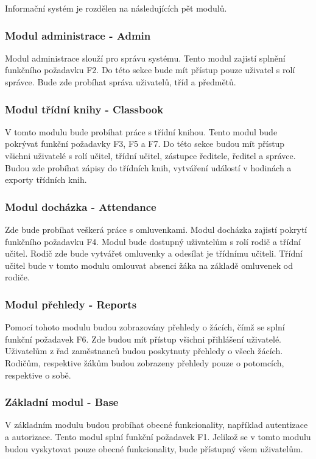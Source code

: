 Informační systém je rozdělen na následujících pět modulů.

\subsubsection*{Modul administrace - Admin}
Modul administrace slouží pro správu systému. Tento modul zajistí splnění funkčního požadavku F2. Do této sekce bude mít přístup pouze uživatel s rolí správce. Bude zde probíhat správa uživatelů, tříd a předmětů.

\subsubsection*{Modul třídní knihy - Classbook}
V tomto modulu bude probíhat práce s třídní knihou. Tento modul bude pokrývat funkční požadavky F3, F5 a F7. Do této sekce budou mít přístup všichni uživatelé s rolí učitel, třídní učitel, zástupce ředitele, ředitel a správce. Budou zde probíhat zápisy do třídních knih, vytváření událostí v hodinách a exporty třídních knih.

\subsubsection*{Modul docházka - Attendance}
Zde bude probíhat veškerá práce s omluvenkami. Modul docházka zajistí pokrytí funkčního požadavku F4. Modul bude dostupný uživatelům s rolí rodič a třídní učitel. Rodič zde bude vytvářet omluvenky a odesílat je třídnímu učiteli. Třídní učitel bude v tomto modulu omlouvat absenci žáka na základě omluvenek od rodiče.

\subsubsection*{Modul přehledy - Reports}
Pomocí tohoto modulu budou zobrazovány přehledy o žácích, čímž se splní funkční požadavek F6. Zde budou mít přístup všichni přihlášení uživatelé. Uživatelům z řad zaměstnanců budou poskytnuty přehledy o všech žácích. Rodičům, respektive žákům budou zobrazeny přehledy pouze o potomcích, respektive o sobě.

\subsubsection*{Základní modul - Base}
V základním modulu budou probíhat obecné funkcionality, například autentizace a autorizace. Tento modul splní funkční požadavek F1. Jelikož se v tomto modulu budou vyskytovat pouze obecné funkcionality, bude přístupný všem uživatelům.


